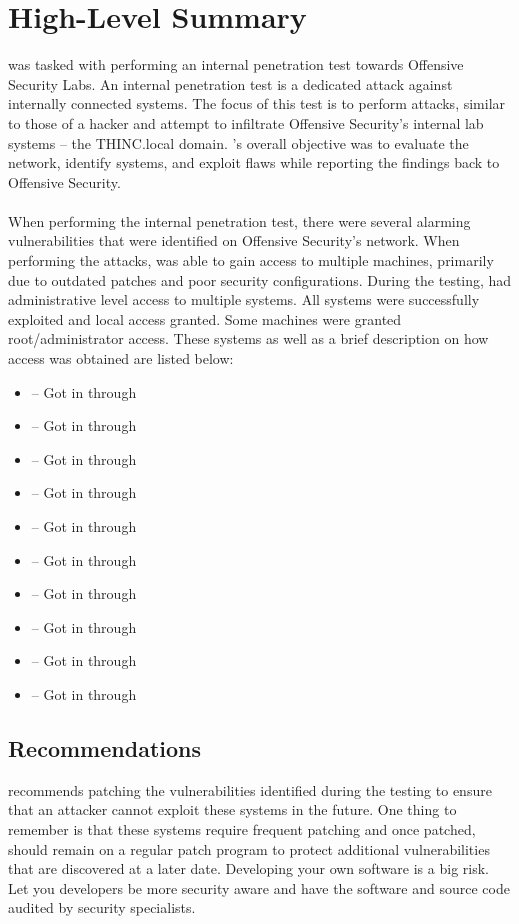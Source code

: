 \section{High-Level Summary}
{\fullname} was tasked with performing an internal penetration test towards Offensive Security Labs.
An internal penetration test is a dedicated attack against internally connected systems. The focus of this
test is to perform attacks, similar to those of a hacker and attempt to infiltrate Offensive Security’s
internal lab systems – the THINC.local domain. \firstname’s overall objective was to evaluate the network,
identify systems, and exploit flaws while reporting the findings back to Offensive Security.
\\\\
When performing the internal penetration test, there were several alarming vulnerabilities that were
identified on Offensive Security’s network. When performing the attacks, {\firstname} was able to gain access
to multiple machines, primarily due to outdated patches and poor security configurations. During the
testing, {\firstname} had administrative level access to multiple systems. All systems were successfully
exploited and local access granted. Some machines were granted root/administrator access. These
systems as well as a brief description on how access was obtained are listed below:

\begin{itemize}
\item {\ipA} – Got in through {\vulnxA}
\ifdefined\gotB
\item {\ipB} – Got in through {\vulnxB}
\ifdefined\gotC
\item {\ipC} – Got in through {\vulnxC}
\ifdefined\gotD
\item {\ipD} – Got in through {\vulnxD}
\ifdefined\gotE
\item {\ipE} – Got in through {\vulnxE}
\ifdefined\gotF
\item {\ipF} – Got in through {\vulnxF}
\ifdefined\gotG
\item {\ipG} – Got in through {\vulnxG}
\ifdefined\gotH
\item {\ipH} – Got in through {\vulnxH}
\ifdefined\gotI
\item {\ipI} – Got in through {\vulnxI}
\ifdefined\gotJ
\item {\ipJ} – Got in through {\vulnxJ}
\fi
\fi
\fi
\fi
\fi
\fi
\fi
\fi
\fi
\end{itemize}

\subsection{Recommendations}
{\firstname} recommends patching the vulnerabilities identified during the testing to ensure that an attacker
cannot exploit these systems in the future. One thing to remember is that these systems require
frequent patching and once patched, should remain on a regular patch program to protect additional
vulnerabilities that are discovered at a later date. Developing your own software is a big risk. Let you
developers be more security aware and have the software and source code audited by security
specialists.

